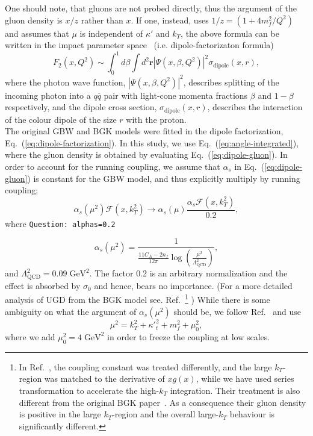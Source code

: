 \documentclass[11pt]{article}
\numberwithin{equation}{section}
\numberwithin{table}{section}
\numberwithin{figure}{section}
\newcommand{\GeV}[0]{\mathrm{GeV}}
\newcommand{\comment}[1]{\texttt{\color{red}#1}}
\begin{document}
One should note, that gluons are not probed directly, thus the argument of the gluon density is $x/z$ rather than $x$.
If one, instead, uses $ 1/z=\left(1+4 m_f^2/Q^2\right)$ and assumes that $\mu$ is independent of $\kappa'$ and $k_T$, 
the above formula can be written in the impact parameter space~\cite{Golec-Biernat:1998zce,Nikolaev:1990ja} (i.e. dipole-factorizaton formula)
\begin{equation}
F_2\left(x,Q^2\right)\sim\int^1_0d\beta \int d^2\mathbf{r}\left|\Psi\left(x,\beta,Q^2\right)\right|^2\sigma_{\mathrm{dipole}}\left(x,r\right),
\label{eq:dipole-factorization}
\end{equation}
where the photon wave function, $\left|\Psi\left(x,\beta,Q^2\right)\right|^2$, describes splitting of the incoming photon into a $q\overline{q}$ pair with light-cone momenta fractions $\beta$ and $1-\beta$ respectively, and the dipole cross section, $\sigma_{\mathrm{dipole}}\left(x,r\right)$, describes the interaction of the colour dipole of the size $r$ with the proton.\\

The original GBW and BGK models were fitted in the dipole factorization, Eq.~(\ref{eq:dipole-factorization}). In this study, we use Eq.~(\ref{eq:angle-integrated}), where the gluon density is obtained by evaluating Eq.~(\ref{eq:dipole-gluon}).
In order to account for the running coupling, we assume that $\alpha_s$ in Eq.~(\ref{eq:dipole-gluon}) is constant for the GBW model, and thus explicitly multiply by running coupling;
%
\begin{equation}
\alpha_s(\mu^2)\mathcal{F}(x,k_T^2)\rightarrow \alpha_s(\mu)\frac{\alpha_s\mathcal{F}(x,k_T^2)}{0.2},
\end{equation}
where %
%
\comment{Question: alphas=0.2}

\begin{equation}
\alpha_s(\mu^2)=\frac{1}{\frac{11 C_A-2n_f}{12\pi}\log\left(\frac{\mu^2}{\Lambda_{\mathrm{QCD}}^2 }\right)},
\end{equation}
and  $\Lambda_{\mathrm{QCD}}^2=0.09\;\GeV^2$.
The factor 0.2 is an arbitrary normalization and the effect is absorbed by $\sigma_0$ and hence, bears no importance.
(For a more detailed analysis of UGD from the BGK model see. Ref.~\cite{Luszczak:2022fkf}\footnote{In Ref.~\cite{Luszczak:2022fkf}, the coupling constant was treated differently, and the large $k_T$-region was matched to the derivative of $xg(x)$, while we have used series transformation to accelerate the high-$k_T$ integration. Their treatment is also different from the original BGK paper~\cite{Bartels:2002cj}. As a consequence their gluon density is positive in the large $k_T$-region and the overall large-$k_T$ behaviour is significantly different.}
)
While there is some ambiguity on what the argument of $\alpha_s(\mu^2)$ should be, we follow Ref.~\cite{Kwiecinski:1997ee} and use
\begin{equation}
	\mu^2=k_T^2+{\kappa'}_t^2+m_f^2+\mu^2_0,
\end{equation}
where we add $\mu^2_0=4\;\GeV^2$ in order to freeze the coupling at low scales.
\end{document}
